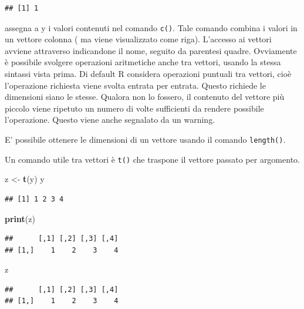 \documentclass[]{book}
\newenvironment{Shaded}{\begin{snugshade}}{\end{snugshade}}
\newcommand{\KeywordTok}[1]{\textcolor[rgb]{0.13,0.29,0.53}{\textbf{#1}}}
\newcommand{\NormalTok}[1]{#1}
\newcommand{\StringTok}[1]{\textcolor[rgb]{0.31,0.60,0.02}{#1}}
\begin{document}
\begin{verbatim}
## [1] 1
\end{verbatim}

assegna a y i valori contenuti nel comando \texttt{c()}. Tale comando combina i valori in un vettore colonna ( ma viene visualizzato come riga). L'accesso ai vettori avviene attraverso indicandone il nome, seguito da parentesi quadre. Ovviamente è possibile svolgere operazioni aritmetiche anche tra vettori, usando la stessa sintassi vista prima.
Di default R considera operazioni puntuali tra vettori, cioè l'operazione richiesta viene svolta entrata per entrata. Questo richiede le dimensioni siano le stesse. Qualora non lo fossero, il contenuto del vettore più piccolo viene ripetuto un numero di volte sufficienti da rendere possibile l'operazione. Questo viene anche segnalato da un warning.

E' possibile ottenere le dimensioni di un vettore usando il comando \texttt{length()}.

Un comando utile tra vettori è \texttt{t()} che traspone il vettore passato per argomento.

\begin{Shaded}
\begin{Highlighting}[]
\NormalTok{z <-}\StringTok{ }\KeywordTok{t}\NormalTok{(y)}
\NormalTok{y}
\end{Highlighting}
\end{Shaded}

\begin{verbatim}
## [1] 1 2 3 4
\end{verbatim}

\begin{Shaded}
\begin{Highlighting}[]
\KeywordTok{print}\NormalTok{(z)}
\end{Highlighting}
\end{Shaded}

\begin{verbatim}
##      [,1] [,2] [,3] [,4]
## [1,]    1    2    3    4
\end{verbatim}

\begin{Shaded}
\begin{Highlighting}[]
\NormalTok{z}
\end{Highlighting}
\end{Shaded}

\begin{verbatim}
##      [,1] [,2] [,3] [,4]
## [1,]    1    2    3    4
\end{verbatim}
\end{document}
